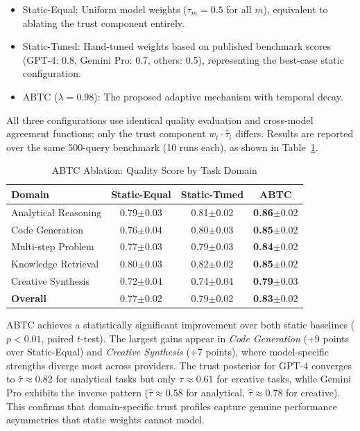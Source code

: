 \documentclass{iopjournal}
\begin{document}
\begin{itemize}
    \item Static-Equal: Uniform model weights ($\tau_m = 0.5$ for all $m$), equivalent to ablating the trust component entirely.
    \item Static-Tuned: Hand-tuned weights based on published benchmark scores (GPT-4: 0.8, Gemini Pro: 0.7, others: 0.5), representing the best-case static configuration.
    \item ABTC ($\lambda = 0.98$): The proposed adaptive mechanism with temporal decay.
\end{itemize}

All three configurations use identical quality evaluation and cross-model agreement functions; only the trust component $w_t \cdot \hat{\tau}_i$ differs. Results are reported over the same 500-query benchmark (10 runs each), as shown in Table~\ref{tab:abtc_ablation}.

\begin{table}[H]
\centering
\caption{ABTC Ablation: Quality Score by Task Domain}
\label{tab:abtc_ablation}
\begin{tabular}{@{}lccc@{}}
\toprule
\textbf{Domain} & \textbf{Static-Equal} & \textbf{Static-Tuned} & \textbf{ABTC} \\
\midrule
Analytical Reasoning   & 0.79$\pm$0.03 & 0.81$\pm$0.02 & \textbf{0.86}$\pm$0.02 \\
Code Generation        & 0.76$\pm$0.04 & 0.80$\pm$0.03 & \textbf{0.85}$\pm$0.02 \\
Multi-step Problem     & 0.77$\pm$0.03 & 0.79$\pm$0.03 & \textbf{0.84}$\pm$0.02 \\
Knowledge Retrieval    & 0.80$\pm$0.03 & 0.82$\pm$0.02 & \textbf{0.85}$\pm$0.02 \\
Creative Synthesis     & 0.72$\pm$0.04 & 0.74$\pm$0.04 & \textbf{0.79}$\pm$0.03 \\
\midrule
\textbf{Overall}       & 0.77$\pm$0.02 & 0.79$\pm$0.02 & \textbf{0.83}$\pm$0.02 \\
\bottomrule
\end{tabular}
\end{table}

ABTC achieves a statistically significant improvement over both static baselines ($p < 0.01$, paired $t$-test). The largest gains appear in \emph{Code Generation} (+9 points over Static-Equal) and \emph{Creative Synthesis} (+7 points), where model-specific strengths diverge most across providers. The trust posterior for GPT-4 converges to $\hat{\tau} \approx 0.82$ for analytical tasks but only $\hat{\tau} \approx 0.61$ for creative tasks, while Gemini Pro exhibits the inverse pattern ($\hat{\tau} \approx 0.58$ for analytical, $\hat{\tau} \approx 0.78$ for creative). This confirms that domain-specific trust profiles capture genuine performance asymmetries that static weights cannot model.
\end{document}
